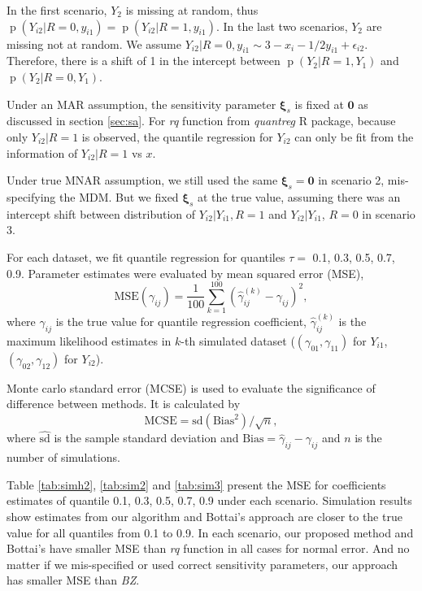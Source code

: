 \documentclass[12pt]{article}
\DeclareMathOperator{\pr}{p}
\begin{document}
In the first scenario, $Y_2$ is missing at random, thus $\pr(Y_{i2} |
R = 0, y_{i1}) = \pr(Y_{i2}|R = 1, y_{i1}) $. In the last two
scenarios, $Y_2$ are missing not at random. We assume $Y_{i2}| R = 0,
y_{i1} \sim 3 - x_i - 1/2y_{i1} + \epsilon_{i2}$. Therefore, there is
a shift of 1 in the intercept between $\pr(Y_2|R = 1, Y_1)$ and
$\pr(Y_2|R = 0, Y_1)$.

Under an MAR assumption, the sensitivity parameter $\bm \xi_s$ is
fixed at $\bm 0$ as discussed in section \ref{sec:sa}. For \textit{rq}
function from \textit{quantreg} R package, because only $Y_{i2}|R = 1$
is observed, the quantile regression for $Y_{i2}$ can only be fit from
the information of $Y_{i2}|R = 1$ vs $x$.

Under true MNAR assumption, we still used the same $\bm \xi_s = \bm 0$
in scenario 2, mis-specifying the MDM. But we fixed $\bm \xi_s$ at the
true value, assuming there was an intercept shift between distribution
of $Y_{i2}|Y_{i1}, R = 1$ and $Y_{i2}|Y_{i1}$, $R = 0$ in scenario 3.

For each dataset, we fit quantile regression for quantiles $\tau =$
0.1, 0.3, 0.5, 0.7, 0.9.  Parameter estimates were evaluated by mean
squared error (MSE),
\begin{equation*}
  \text{MSE} (\gamma_{ij}) = \frac{1}{100} \sum_{k = 1}^{100}
  \left( \hat{\gamma}_{ij}^{(k)}  - \gamma_{ij}\right)^2,
\end{equation*}
where $\gamma_{ij}$ is the true value for quantile regression
coefficient, $\hat{\gamma}_{ij}^{(k)}$ is the maximum likelihood
estimates in $k$-th simulated dataset ($(\gamma_{01}, \gamma_{11})$
for $Y_{i1}$, $(\gamma_{02}, \gamma_{12})$ for $Y_{i2}$).

Monte carlo standard error (MCSE) is used to evaluate the significance
of difference between methods. It is calculated by
\begin{displaymath}
  \text{MCSE} = \hat{\text{sd}}(\text{Bias}^2)/\sqrt{n},
\end{displaymath}
where $\hat{\text{sd}}$ is the sample standard deviation and
$\text{Bias} = \hat{\gamma}_{ij} - \gamma_{ij}$ and $n$ is the number of
simulations.

Table \ref{tab:simh2}, \ref{tab:sim2} and \ref{tab:sim3} present the
MSE for coefficients estimates of quantile 0.1, 0.3, 0.5, 0.7, 0.9
under each scenario.  Simulation results show estimates from our
algorithm and Bottai's approach are closer to the true value for all
quantiles from 0.1 to 0.9.  In each scenario, our proposed method and
Bottai's have smaller MSE than \textit{rq} function in all cases for
normal error. And no matter if we mis-specified or used correct
sensitivity parameters, our approach has smaller MSE than \textit{BZ}.
\end{document}
